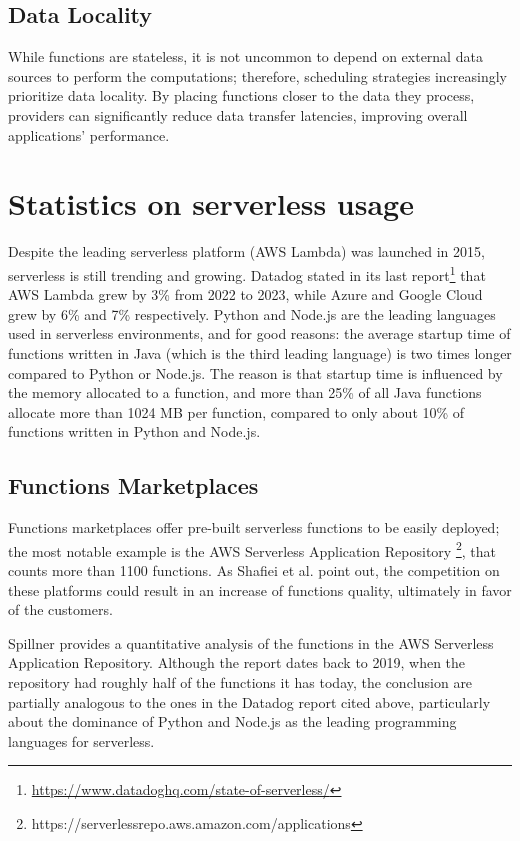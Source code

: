 \documentclass[
	a4paper, %
	12pt,
	twoside, %
]{LTJournalArticle}
\begin{document}
\subsection{Data Locality}
While functions are stateless, it is not uncommon to depend on external data sources to perform the computations; therefore, scheduling strategies increasingly prioritize data locality. By placing functions closer to the data they process, providers can significantly reduce data transfer latencies, improving overall applications' performance.

\section{Statistics on serverless usage}
Despite the leading serverless platform (AWS Lambda) was launched in 2015, serverless is still trending and growing. Datadog stated in its last report\footnote{\href{https://www.datadoghq.com/state-of-serverless/}{https://www.datadoghq.com/state-of-serverless/}} that AWS Lambda grew by 3\% from 2022 to 2023, while Azure and Google Cloud grew by 6\% and 7\% respectively. Python and Node.js are the leading languages used in serverless environments, and for good reasons: the average startup time of functions written in Java (which is the third leading language) is two times longer compared to Python or Node.js. The reason is that startup time is influenced by the memory allocated to a function, and more than 25\% of all Java functions allocate more than 1024 MB per function, compared to only about 10\% of functions written in Python and Node.js.

\subsection{Functions Marketplaces}
Functions marketplaces offer pre-built serverless functions to be easily deployed; the most notable example is the AWS Serverless Application Repository \footnote{https://serverlessrepo.aws.amazon.com/applications}, that counts more than 1100 functions. As Shafiei et al. \cite{shafiei_serverless_2022} point out, the competition on these platforms could result in an increase of functions quality, ultimately in favor of the customers. 

Spillner \cite{spillner_quantitative_2019} provides a quantitative analysis of the functions in the AWS Serverless Application Repository. Although the report dates back to 2019, when the repository had roughly half of the functions it has today, the conclusion are partially analogous to the ones in the Datadog report cited above, particularly about the dominance of Python and Node.js as the leading programming languages for serverless.
\end{document}
